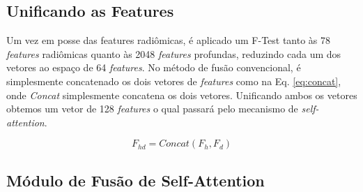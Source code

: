 \subsection{Unificando as Features}
\label{subsec:cap4_unificando_features}

Um vez em posse das features radiômicas, é aplicado um F-Test tanto às 78 \textit{features} radiômicas quanto às 2048 \textit{features} profundas, reduzindo cada um dos vetores ao espaço de 64 \textit{features}. No método de fusão convencional, é simplesmente concatenado os dois vetores de \textit{features} como na Eq. \ref{eq:concat}, onde \textit{Concat} simplesmente concatena os dois vetores. Unificando ambos os vetores obtemos um vetor de 128 \textit{features} o qual passará pelo mecanismo de \textit{self-attention}.

\begin{equation}
F_{hd} = \textit{Concat}(F_h, F_d)
\label{eq:concat}
\end{equation}

\subsection{Módulo de Fusão de Self-Attention}
\label{subsec:cap4_mod_self_attention}

